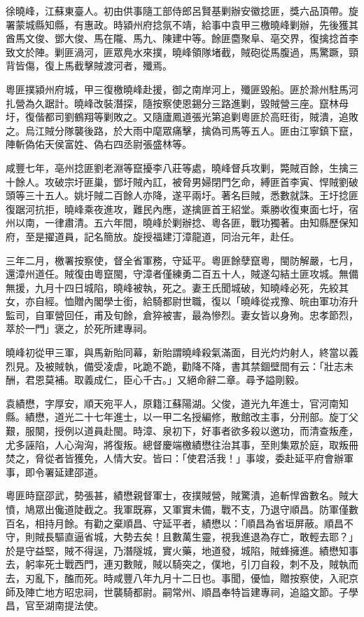 \begin{pinyinscope}
徐曉峰，江蘇東臺人。初由供事隨工部侍郎呂賢基剿辦安徽捻匪，獎六品頂帶。旋署蒙城縣知縣，有惠政。時潁州府捻氛不靖，給事中袁甲三檄曉峰剿辦，先後獲其酋馬文俊、鄧大俊、馬在隴、馬九、陳建中等。餘匪麕聚阜、亳交界，復擒捻首李致文於陣。剿匪渦河，匪眾鳧水來撲，曉峰領隊堵截，賊砲從馬腹過，馬驚蹶，頸背皆傷，復上馬截擊賊渡河者，殲焉。

粵匪撲潁州府城，甲三復檄曉峰赴援，御之南岸河上，殲匪毀船。匪於滁州駐馬河扎營為久踞計。曉峰改裝潛探，隨按察使恩錫分三路進剿，毀賊營三座。竄林母圩，復偕都司劉鶴翔等剿敗之。又隨廬鳳道張光第追剿粵匪於高旺街，賊潰，追敗之。烏江賊分隊襲後路，於大雨中麾眾痛擊，擒偽司馬等五人。匪由江寧鎮下竄，陣斬偽佑天侯富姓、偽右四丞尉張盛林等。

咸豐七年，亳州捻匪劉老淵等竄擾李八莊等處，曉峰督兵攻剿，斃賊百餘，生擒三十餘人。攻破宗圩匪巢，鄧圩賊內訌，被脅男婦閉門乞命，縛匪首李寅、悍賊劉破頭等三十五人。姚圩賊二百餘人亦降，遂平兩圩。著名巨賊，悉數就誅。王圩捻匪復踞河抗拒，曉峰乘夜進攻，難民內應，遂擒匪首王紹堂。乘勝收復東面七圩，宿州以南，一律肅清。五六年間，曉峰於剿辦捻、粵各匪，戰功獨著。由知縣歷保知府，至是擢道員，記名簡放。旋授福建汀漳龍道，同治元年，赴任。

三年二月，檄署按察使，督全省軍務，守延平。粵匪餘孽竄粵，閩防解嚴，七月，還漳州道任。賊復由粵竄閩，守漳者僅練勇二百五十人，賊遂勾結土匪攻城。無備無援，九月十四日城陷，曉峰被執，死之。妻王氏聞城破，知曉峰必死，先絞其女，亦自經。恤贈內閣學士銜，給騎都尉世職，復以「曉峰從戎豫、皖由軍功洊升監司，自軍營回任，甫及旬餘，倉猝被害，最為慘烈。妻女皆以身殉。忠孝節烈，萃於一門」褒之，於死所建專祠。

曉峰初從甲三軍，與馬新貽同幕，新貽謂曉峰殺氣滿面，目光灼灼射人，終當以義烈見。及被賊執，備受凌虐，叱跪不跪，勸降不降，書其禁錮壁間有云：「壯志未酬，君恩莫補。取義成仁，臣心千古。」又絕命辭二章。尋予謚剛毅。

袁績懋，字厚安，順天宛平人，原籍江蘇陽湖。父俊，道光九年進士，官河南知縣。績懋，道光二十七年進士，以一甲二名授編修，散館改主事，分刑部。旋丁父艱，服闋，授例以道員赴閩。時漳、泉初下，好事者欲多殺以邀功，而清查叛產，尤多誣陷，人心洶洶，將復叛。總督慶端檄績懋往治其事，至則集眾於庭，取叛冊焚之，脅從者皆獲免，人情大安。皆曰：「使君活我！」事竣，委赴延平府會辦軍事，即令署延建邵道。

粵匪時竄邵武，勢張甚，績懋親督軍士，夜撲賊營，賊驚潰，追斬悍酋數名。賊大憤，鳩眾出儳道陡截之。我軍既寡，又軍實未備，戰不支，乃退守順昌。防軍僅數百名，相持月餘。有勸之棄順昌、守延平者，績懋以：「順昌為省垣屏蔽。順昌不守，則賊長驅直逼省城，大勢去矣！且數萬生靈，視我進退為存亡，敢輕去耶？」於是守益堅，賊不得逞，乃潛隧城，實火藥，地道發，城陷，賊蜂擁進。績懋知事去，躬率死士戰西門，連刃數賊，賊以騎突之，僕地，引刀自殺，刺不及，賊執而去，刃亂下，醢而死。時咸豐八年九月十二日也。事聞，優恤，贈按察使，入祀京師及陣亡地方昭忠祠，世襲騎都尉。嗣常州、順昌奉特旨建專祠，追謚文節。子學昌，官至湖南提法使。


\end{pinyinscope}
